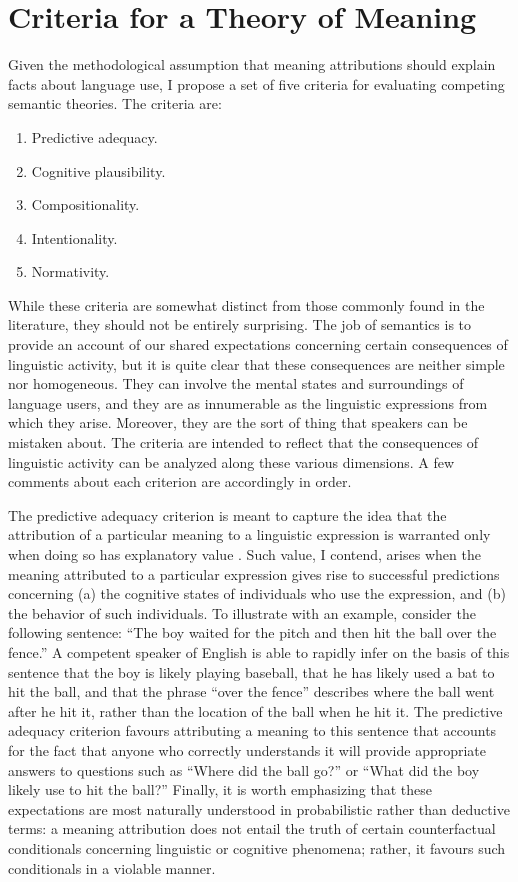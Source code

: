 \section{Criteria for a Theory of Meaning}

Given the methodological assumption that meaning attributions should explain facts about language use, I propose a set of five criteria for evaluating competing semantic theories. The criteria are:

\begin{enumerate}
  \item Predictive adequacy.
  \item Cognitive plausibility. 
  \item Compositionality.
  \item Intentionality.
  \item Normativity.
\end{enumerate}

\noindent
While these criteria are somewhat distinct from those commonly found in the literature, they should not be entirely surprising. The job of semantics is to provide an account of our shared expectations concerning certain consequences of linguistic activity, but it is quite clear that these consequences are neither simple nor homogeneous. They can involve the mental states and surroundings of language users, and they are as innumerable as the linguistic expressions from which they arise. Moreover, they are the sort of thing that speakers can be mistaken about. The criteria are intended to reflect that the consequences of linguistic activity can be analyzed along these various dimensions. A few comments about each criterion are accordingly in order.

The predictive adequacy criterion is meant to capture the idea that the attribution of a particular meaning to a linguistic expression is warranted only when doing so has explanatory value \citep[see][for related ideas]{Hochstein:2011,Dennett:1987}. Such value, I contend, arises when the meaning attributed to a particular expression gives rise to successful predictions concerning (a) the cognitive states of individuals who use the expression, and (b) the behavior of such individuals. To illustrate with an example, consider the following sentence: ``The boy waited for the pitch and then hit the ball over the fence.'' A competent speaker of English is able to rapidly infer on the basis of this sentence that the boy is likely playing baseball, that he has likely used a bat to hit the ball, and that the phrase ``over the fence'' describes where the ball went after he hit it, rather than the location of the ball when he hit it. The predictive adequacy criterion favours attributing a meaning to this sentence that accounts for the fact that anyone who correctly understands it will provide appropriate answers to questions such as ``Where did the ball go?'' or ``What did the boy likely use to hit the ball?'' Finally, it is worth emphasizing that these expectations are most naturally understood in probabilistic rather than deductive terms: a meaning attribution does not entail the truth of certain counterfactual conditionals concerning linguistic or cognitive phenomena; rather, it favours such conditionals in a violable manner.

